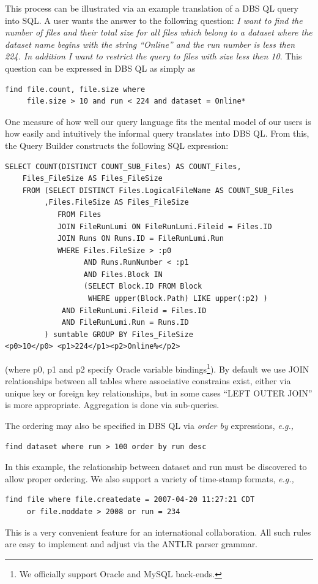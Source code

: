 \documentclass[a4paper]{jpconf}
\begin{document}
This process can be illustrated via an example translation of a
DBS QL query into SQL.  A user wants the answer to the following
question: {\it I want to find the number of files and their total
size for all files which belong to a dataset where the dataset name begins with
the string ``Online''
and the run number is less then 224. In addition I want to restrict the query
to files with size less then 10}. This question can be
expressed in DBS QL as simply as
\begin{verbatim}
find file.count, file.size where 
     file.size > 10 and run < 224 and dataset = Online*
\end{verbatim}
One measure of how well our query language fits the mental model of our users is
how easily and intuitively the informal query translates into DBS QL.
From this, the Query Builder constructs the following SQL expression:
\begin{verbatim}
SELECT COUNT(DISTINCT COUNT_SUB_Files) AS COUNT_Files, 
    Files_FileSize AS Files_FileSize  
    FROM (SELECT DISTINCT Files.LogicalFileName AS COUNT_SUB_Files
         ,Files.FileSize AS Files_FileSize
            FROM Files
            JOIN FileRunLumi ON FileRunLumi.Fileid = Files.ID
            JOIN Runs ON Runs.ID = FileRunLumi.Run
            WHERE Files.FileSize > :p0 
                  AND Runs.RunNumber < :p1
                  AND Files.Block IN 
                  (SELECT Block.ID FROM Block 
                   WHERE upper(Block.Path) LIKE upper(:p2) )
             AND FileRunLumi.Fileid = Files.ID
             AND FileRunLumi.Run = Runs.ID
         ) sumtable GROUP BY Files_FileSize
<p0>10</p0> <p1>224</p1><p2>Online%</p2>
\end{verbatim}
(where p0, p1 and p2 specify Oracle variable bindings\footnote{We officially support Oracle and
MySQL back-ends.}).
By default we use JOIN relationships between all tables where associative
constrains exist, either via unique key or foreign key relationships,
but in some cases ``LEFT OUTER JOIN'' is more appropriate.
Aggregation is done via sub-queries.

The ordering may also be specified in DBS QL via {\it order by}
expressions, {\it e.g.,}
\begin{verbatim}
find dataset where run > 100 order by run desc
\end{verbatim}
In this example, the relationship between dataset and run
must be discovered to allow proper ordering.
We also support a variety of time-stamp formats, {\it e.g.,}
\begin{verbatim}
find file where file.createdate = 2007-04-20 11:27:21 CDT 
     or file.moddate > 2008 or run = 234
\end{verbatim}
This is a very convenient feature for an international collaboration.
All such rules are easy to implement and adjust via the ANTLR parser grammar.
\end{document}
